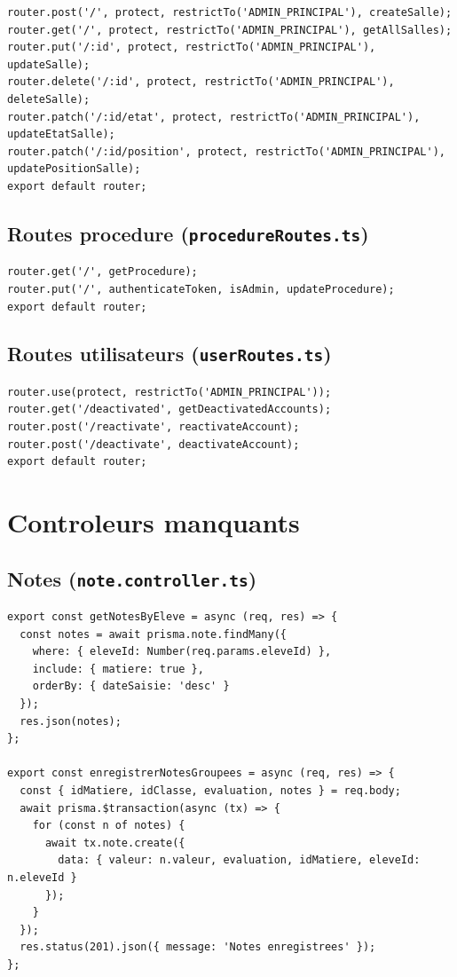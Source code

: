 \documentclass[12pt,a4paper]{article}
\begin{document}
\begin{lstlisting}[style=code]
router.post('/', protect, restrictTo('ADMIN_PRINCIPAL'), createSalle);
router.get('/', protect, restrictTo('ADMIN_PRINCIPAL'), getAllSalles);
router.put('/:id', protect, restrictTo('ADMIN_PRINCIPAL'), updateSalle);
router.delete('/:id', protect, restrictTo('ADMIN_PRINCIPAL'), deleteSalle);
router.patch('/:id/etat', protect, restrictTo('ADMIN_PRINCIPAL'), updateEtatSalle);
router.patch('/:id/position', protect, restrictTo('ADMIN_PRINCIPAL'), updatePositionSalle);
export default router;
\end{lstlisting}

\subsection{Routes procedure (\texttt{procedureRoutes.ts})}

\begin{lstlisting}[style=code]
router.get('/', getProcedure);
router.put('/', authenticateToken, isAdmin, updateProcedure);
export default router;
\end{lstlisting}

\subsection{Routes utilisateurs (\texttt{userRoutes.ts})}

\begin{lstlisting}[style=code]
router.use(protect, restrictTo('ADMIN_PRINCIPAL'));
router.get('/deactivated', getDeactivatedAccounts);
router.post('/reactivate', reactivateAccount);
router.post('/deactivate', deactivateAccount);
export default router;
\end{lstlisting}

\newpage

\section{Controleurs manquants}

\subsection{Notes (\texttt{note.controller.ts})}

\begin{lstlisting}[style=code]
export const getNotesByEleve = async (req, res) => {
  const notes = await prisma.note.findMany({
    where: { eleveId: Number(req.params.eleveId) },
    include: { matiere: true },
    orderBy: { dateSaisie: 'desc' }
  });
  res.json(notes);
};

export const enregistrerNotesGroupees = async (req, res) => {
  const { idMatiere, idClasse, evaluation, notes } = req.body;
  await prisma.$transaction(async (tx) => {
    for (const n of notes) {
      await tx.note.create({
        data: { valeur: n.valeur, evaluation, idMatiere, eleveId: n.eleveId }
      });
    }
  });
  res.status(201).json({ message: 'Notes enregistrees' });
};
\end{lstlisting}
\end{document}
